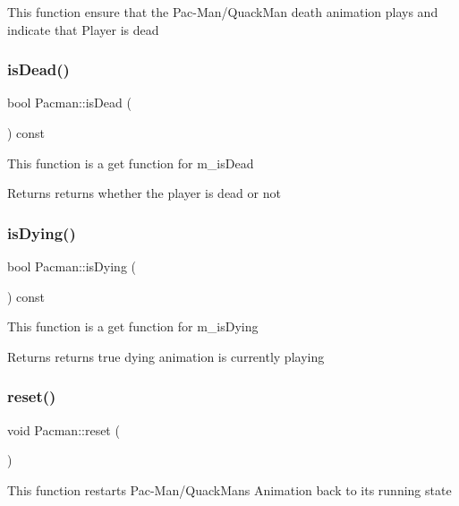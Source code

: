 This function ensure that the Pac-\/\+Man/\+Quack\+Man death animation plays and indicate that Player is dead \mbox{\label{class_pacman_a5f0f0398fc20f7c06c5f05a20ad2c1ed}} 
\subsubsection{\texorpdfstring{is\+Dead()}{isDead()}}
{\footnotesize\ttfamily bool Pacman\+::is\+Dead (\begin{DoxyParamCaption}{ }\end{DoxyParamCaption}) const}

This function is a get function for m\+\_\+is\+Dead

\begin{DoxyReturn}{Returns}
returns whether the player is dead or not 
\end{DoxyReturn}
\mbox{\label{class_pacman_afefb1eac50a96a7449ee8e910688614e}} 
\subsubsection{\texorpdfstring{is\+Dying()}{isDying()}}
{\footnotesize\ttfamily bool Pacman\+::is\+Dying (\begin{DoxyParamCaption}{ }\end{DoxyParamCaption}) const}

This function is a get function for m\+\_\+is\+Dying

\begin{DoxyReturn}{Returns}
returns true dying animation is currently playing 
\end{DoxyReturn}
\mbox{\label{class_pacman_a6b190109b2d9400c4eb7c52913ffd0c6}} 
\subsubsection{\texorpdfstring{reset()}{reset()}}
{\footnotesize\ttfamily void Pacman\+::reset (\begin{DoxyParamCaption}{ }\end{DoxyParamCaption})}

This function restarts Pac-\/\+Man/\+Quack\+Man\textquotesingle{}s Animation back to it\textquotesingle{}s running state \mbox{\label{class_pacman_a6badb47a28223991a1eb540f9d970e77}} 
